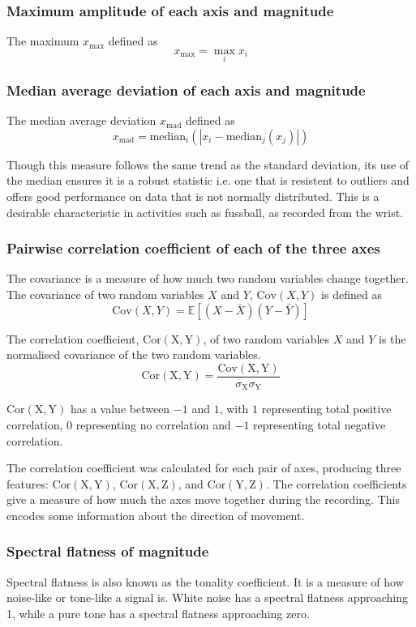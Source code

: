       \subsubsection{Maximum amplitude of each axis and magnitude}
        The maximum $x_{\max}$ defined as $$x_{\max} = \max_i x_i $$
      \subsubsection{Median average deviation of each axis and magnitude}
        The median average deviation $x_\mathrm{mad}$ defined as $$x_\mathrm{mad} = \mathrm{median}_i (|x_i - \mathrm{median}_j(x_j)|)$$
        
        Though this measure follows the same trend as the standard deviation, its use of the median ensures it is a robust statistic i.e. one that is resistent to outliers and offers good performance on data that is not normally distributed. This is a desirable characteristic in activities such as fussball, as recorded from the wrist.
      \subsubsection{Pairwise correlation coefficient of each of the three axes}
        The covariance is a measure of how much two random variables change together. The covariance of two random variables $X$ and $Y$, $\mathrm{Cov}(X, Y)$ is defined as $$\mathrm{Cov}(X, Y) = \mathbb{E}[(X - \bar{X})(Y - \bar{Y})]$$
        
        The correlation coefficient, $\mathrm{Cor(X,Y)}$, of two random variables $X$ and $Y$ is the normalised covariance of the two random variables. $$\mathrm{Cor(X,Y)} = \frac{\mathrm{Cov(X,Y)}}{\sigma_{\mathrm{X}}\sigma_{\mathrm{Y}}}$$
        
        $\mathrm{Cor(X,Y)}$ has a value between $-1$ and $1$, with $1$ representing total positive correlation, $0$ representing no correlation and $-1$ representing total negative correlation.
         
        The correlation coefficient was calculated for each pair of axes, producing three features: $\mathrm{Cor(X,Y)}$, $\mathrm{Cor(X,Z)}$, and $\mathrm{Cor(Y,Z)}$. The correlation coefficients give a measure of how much the axes move together during the recording. This encodes some information about the direction of movement.
      \subsubsection{Spectral flatness of magnitude}
        Spectral flatness is also known as the tonality coefficient. It is a measure of how noise-like or tone-like a signal is. White noise has a spectral flatness approaching 1, while a pure tone has a spectral flatness approaching zero.
        

